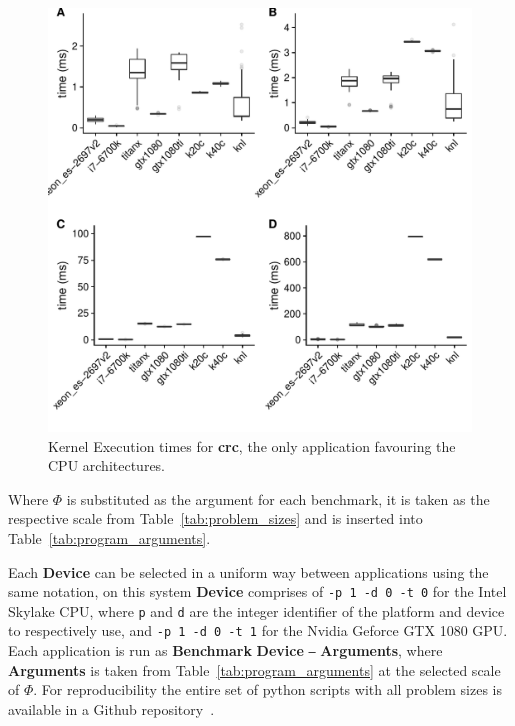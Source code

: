 \documentclass[../document.tex]{subfiles}
\begin{document}
\begin{figure}
\begin{minipage}[t]{.45\textwidth}
\includegraphics[width=\textwidth]{figures/time-results/crc.pdf}
\caption{Kernel Execution times for {\bf crc}, the only application favouring the CPU architectures.}
\label{fig:time-crc}
\end{minipage}
\end{figure}
Where $\Phi$ is substituted as the argument for each benchmark, it is taken as the respective scale from Table~\ref{tab:problem_sizes} and is inserted into Table~\ref{tab:program_arguments}.

Each {\bf Device} can be selected in a uniform way between applications using the same notation, on this system {\bf Device} comprises of {\tt -p 1 -d 0 -t 0} for the Intel Skylake CPU, where {\tt p} and {\tt d} are the integer identifier of the platform and device to respectively use, and {\tt -p 1 -d 0 -t 1} for the Nvidia Geforce GTX 1080 GPU.
Each application is run as {\bf Benchmark} {\bf Device} {\tt --} {\bf Arguments}, where {\bf Arguments} is taken from Table~\ref{tab:program_arguments} at the selected scale of $\Phi$.
For reproducibility the entire set of python scripts with all problem sizes is available in a Github repository~\cite{johnston2017}. 
\end{document}
